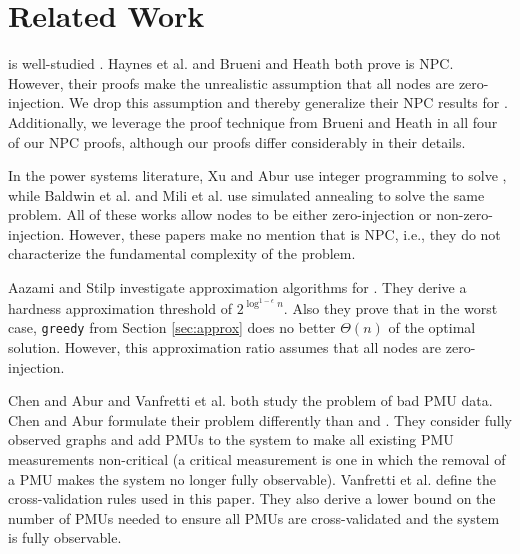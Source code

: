 \section{Related Work}
\label{sec:related-pmu}

\full is well-studied \cite{Baldwin93,Brueni05,Haynes02, Mili90, Xu04}.  
Haynes et al. \cite{Haynes02} and Brueni and Heath \cite{Brueni05} both prove \full is NPC.  
However, their proofs make the unrealistic assumption that all nodes are zero-injection.  We drop this assumption and thereby generalize their NPC results for \fulls.
Additionally, we leverage the proof technique from Brueni and Heath \cite{Brueni05} in all four of our NPC proofs, although our proofs
differ considerably in their details. 

In the power systems literature, Xu and Abur \cite{Xu04,Xu05} use integer programming to solve \fulls, while Baldwin et al. \cite{Baldwin93} and Mili et al. \cite{Mili90} use simulated annealing 
to solve the same problem. All of these works allow nodes to be either zero-injection or non-zero-injection.  However,
these papers make no mention that \full is NPC, i.e., they do not characterize the fundamental complexity of the problem. 

Aazami and Stilp \cite{Aazami07} investigate approximation algorithms for \fulls.  They derive a hardness approximation threshold of $2^{\log^{1 -\epsilon}n}$.
Also they prove that in the worst case, {\tt greedy} from Section \ref{sec:approx} does no better $\Theta(n)$ of the optimal solution.  However, this approximation ratio assumes that 
all nodes are zero-injection.

Chen and Abur \cite{Abur06} and Vanfretti et al. \cite{Vanfretti10} both study the problem of bad PMU data. Chen and Abur \cite{Abur06} formulate their problem differently than \xval and \xvalparts.  
They consider fully observed graphs and add PMUs to the system to make all existing PMU measurements non-critical 
(a critical measurement is one in which the removal of a PMU makes the system
no longer fully observable). Vanfretti et al. \cite{Vanfretti10} define the cross-validation rules used in this paper.  They also derive a
lower bound on the number of PMUs needed to ensure all PMUs are cross-validated and the system is fully observable. 

